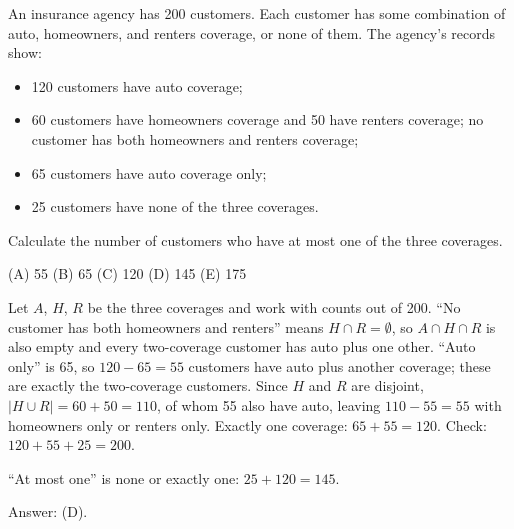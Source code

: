 \begin{example}
An insurance agency has 200 customers. Each customer has some combination of auto,
homeowners, and renters coverage, or none of them. The agency's records show:
\begin{itemize}[nosep]
  \item 120 customers have auto coverage;
  \item 60 customers have homeowners coverage and 50 have renters coverage; no
        customer has both homeowners and renters coverage;
  \item 65 customers have auto coverage only;
  \item 25 customers have none of the three coverages.
\end{itemize}
Calculate the number of customers who have at most one of the three coverages.

(A) 55 \quad (B) 65 \quad (C) 120 \quad (D) 145 \quad (E) 175
\end{example}
\begin{solution}
Let $A$, $H$, $R$ be the three coverages and work with counts out of 200.
``No customer has both homeowners and renters'' means $H \cap R = \emptyset$, so
$A \cap H \cap R$ is also empty and every two-coverage customer has auto plus one
other. ``Auto only'' is 65, so $120 - 65 = 55$ customers have auto plus another
coverage; these are exactly the two-coverage customers. Since $H$ and $R$ are
disjoint, $|H \cup R| = 60 + 50 = 110$, of whom 55 also have auto, leaving
$110 - 55 = 55$ with homeowners only or renters only. Exactly one coverage:
$65 + 55 = 120$. Check: $120 + 55 + 25 = 200$.

``At most one'' is none or exactly one: $25 + 120 = 145$.

Answer: (D).
\end{solution}

